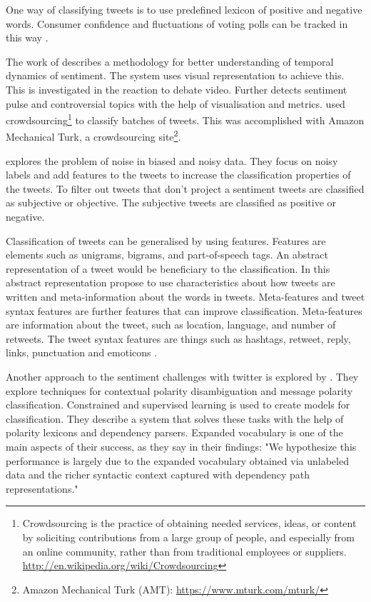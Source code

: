 One way of classifying tweets is to use predefined lexicon of positive and
negative words. Consumer confidence and fluctuations of voting polls can be
tracked in this way \cite[]{connor2010}.

The work of \cite[]{diakopoulos2010} describes a methodology for better
understanding of temporal dynamics of sentiment. 
The system uses visual representation to achieve this. 
This is investigated in the reaction to debate video.
	Further \cite[]{diakopoulos2010} detects sentiment pulse and controversial
topics with the help of visualisation and metrics. 
	\cite[]{diakopoulos2010} used crowdsourcing\footnote{Crowdsourcing is the
practice of obtaining needed services, ideas, or content by soliciting
contributions from a large group of people, and especially from an online
community, rather than from traditional employees or suppliers.
\url{http://en.wikipedia.org/wiki/Crowdsourcing}} to classify batches of tweets.
This was accomplished with Amazon Mechanical Turk, a crowdsourcing
site\footnote{Amazon Mechanical Turk (AMT): \url{https://www.mturk.com/mturk/}}.

\cite[]{barbosa10} explores the problem of noise in biased and noisy data. 
They focus on noisy labels and add features to the tweets to increase the
classification properties of the tweets. To filter out tweets that don't project a
sentiment tweets are classified as subjective or objective. The subjective tweets are classified as positive or negative.

Classification of tweets can be generalised by using features. Features are
elements such as unigrams, bigrams, and part-of-speech tags. An abstract
representation of a tweet would be beneficiary to the classification. In this
abstract representation \cite[]{barbosa10} propose to use characteristics about
how tweets are written and meta-information about the words in tweets. 
Meta-features and tweet syntax features are further features that can improve
classification. Meta-features are information about the tweet, such as
location, language, and number of retweets. The tweet syntax features are things such as hashtags, retweet,
reply, links, punctuation and emoticons \cite[]{barbosa10}. 

Another approach to the sentiment challenges with twitter is explored by
\cite[]{becker13}. They explore techniques for contextual polarity
disambiguation and message polarity classification. Constrained and supervised
learning is used to create models for classification. They describe a system
that solves these tasks with the help of polarity lexicons and dependency
parsers. Expanded vocabulary is one of the main aspects of their success, as
they say in their findings: "We hypothesize this performance is largely due to
the expanded vocabulary obtained via unlabeled data and the richer syntactic
context captured with dependency path representations." \cite[]{becker13}

